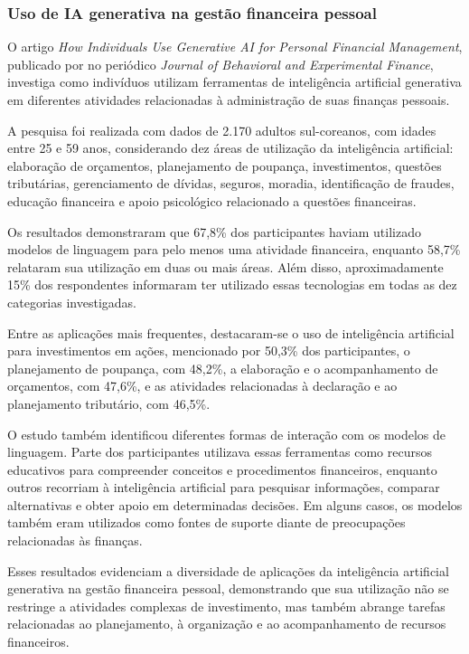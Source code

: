 \subsubsection{Uso de IA generativa na gestão financeira pessoal}

O artigo \textit{How Individuals Use Generative AI for Personal Financial Management}, publicado por  no periódico \textit{Journal of Behavioral and Experimental Finance}, investiga como indivíduos utilizam ferramentas de inteligência artificial generativa em diferentes atividades relacionadas à administração de suas finanças pessoais.

A pesquisa foi realizada com dados de 2.170 adultos sul-coreanos, com idades entre 25 e 59 anos, considerando dez áreas de utilização da inteligência artificial: elaboração de orçamentos, planejamento de poupança, investimentos, questões tributárias, gerenciamento de dívidas, seguros, moradia, identificação de fraudes, educação financeira e apoio psicológico relacionado a questões financeiras.

Os resultados demonstraram que 67,8\% dos participantes haviam utilizado modelos de linguagem para pelo menos uma atividade financeira, enquanto 58,7\% relataram sua utilização em duas ou mais áreas. Além disso, aproximadamente 15\% dos respondentes informaram ter utilizado essas tecnologias em todas as dez categorias investigadas.

Entre as aplicações mais frequentes, destacaram-se o uso de inteligência artificial para investimentos em ações, mencionado por 50,3\% dos participantes, o planejamento de poupança, com 48,2\%, a elaboração e o acompanhamento de orçamentos, com 47,6\%, e as atividades relacionadas à declaração e ao planejamento tributário, com 46,5\%.

O estudo também identificou diferentes formas de interação com os modelos de linguagem. Parte dos participantes utilizava essas ferramentas como recursos educativos para compreender conceitos e procedimentos financeiros, enquanto outros recorriam à inteligência artificial para pesquisar informações, comparar alternativas e obter apoio em determinadas decisões. Em alguns casos, os modelos também eram utilizados como fontes de suporte diante de preocupações relacionadas às finanças.

Esses resultados evidenciam a diversidade de aplicações da inteligência artificial generativa na gestão financeira pessoal, demonstrando que sua utilização não se restringe a atividades complexas de investimento, mas também abrange tarefas relacionadas ao planejamento, à organização e ao acompanhamento de recursos financeiros.

